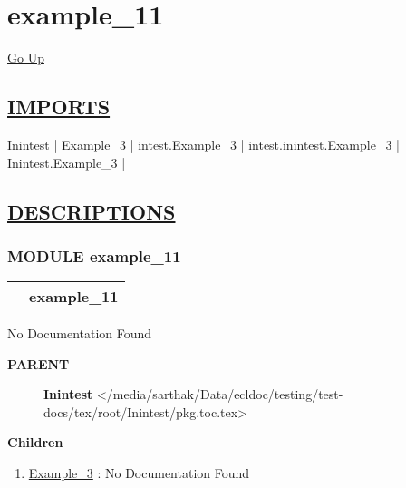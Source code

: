 \chapter*{\color{headfile}
example_11
}
\hypertarget{ecldoc:toc:example_11}{}
\hyperlink{ecldoc:toc:root}{Go Up}

\section*{\underline{\textsf{IMPORTS}}}
\begin{doublespace}
{\large
Inintest |
Example\_3 |
intest.Example\_3 |
intest.inintest.Example\_3 |
Inintest.Example\_3 |
}
\end{doublespace}

\section*{\underline{\textsf{DESCRIPTIONS}}}
\subsection*{\textsf{\colorbox{headtoc}{\color{white} MODULE}
example\_11}}

\hypertarget{ecldoc:example_11}{}

{\renewcommand{\arraystretch}{1.5}
\begin{tabularx}{\textwidth}{|>{\raggedright\arraybackslash}l|X|}
\hline
\hspace{0pt}\mytexttt{\color{red} } & \textbf{example\_11} \\
\hline
\end{tabularx}
}

\par





No Documentation Found










\par
\begin{description}
\item [\colorbox{tagtype}{\color{white} \textbf{\textsf{PARENT}}}] \textbf{Inintest} </media/sarthak/Data/ecldoc/testing/test-docs/tex/root/Inintest/pkg.toc.tex>
\end{description}


\textbf{Children}
\begin{enumerate}
\item \hyperlink{ecldoc:Inintest.Example_3}{Example\_3}
: No Documentation Found
\end{enumerate}

